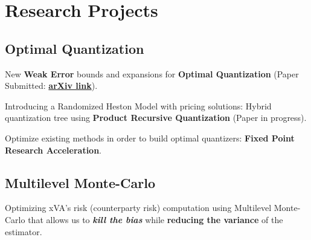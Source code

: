 \documentclass[]{deedy-resume-openfont}
\begin{document}
%
%
\lastupdated

%
%

%
%

\begin{minipage}[t]{0.33\textwidth}



\section{Research Projects}

\subsection{Optimal Quantization}
\vspace{\topsep}
\begin{tightemize}
\item New \textbf{Weak Error} bounds and expansions for \textbf{Optimal Quantization} (Paper Submitted: \href{https://arxiv.org/abs/1903.10330}{\textbf{arXiv link}}).
\item Introducing a Randomized Heston Model with pricing solutions: Hybrid quantization tree using \textbf{Product Recursive Quantization} (Paper in progress).
\item Optimize existing methods in order to build optimal quantizers: \textbf{Fixed Point Research Acceleration}. 
\end{tightemize}
\sectionsep
\subsection{Multilevel Monte-Carlo}
\vspace{\topsep}
\begin{tightemize}
\item Optimizing xVA's risk (counterparty risk) computation using Multilevel Monte-Carlo that allows us to \textbf{\textit{kill the bias}} while \textbf{reducing the variance} of the estimator. 
\end{tightemize}





\end{minipage}
\end{document}
